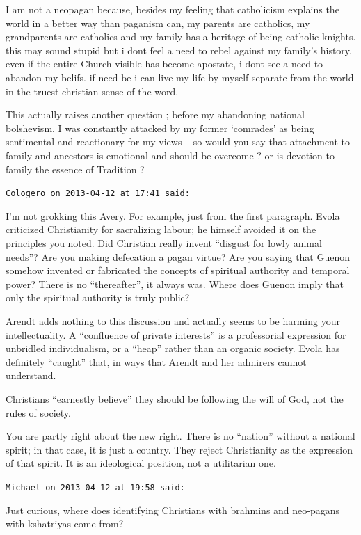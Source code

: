 \begin{footnotesize}
\begin{sffamily}
I am not a neopagan because, besides my feeling that catholicism explains the world in a better way than paganism can, my parents are catholics, my grandparents are catholics and my family has a heritage of being catholic knights. this may sound stupid but i dont feel a need to rebel against my family's history, even if the entire Church visible has become apostate, i dont see a need to abandon my belifs. if need be i can live my life by myself separate from the world in the truest christian sense of the word.

This actually raises another question ; before my abandoning national bolshevism, I was constantly attacked by my former `comrades' as being sentimental and reactionary for my views -- so would you say that attachment to family and ancestors is emotional and should be overcome ? or is devotion to family the essence of Tradition ?

\hfill

\texttt{Cologero on 2013-04-12 at 17:41 said:}

I'm not grokking this Avery. For example, just from the first paragraph. Evola criticized Christianity for sacralizing labour; he himself avoided it on the principles you noted. Did Christian really invent ``disgust for lowly animal needs''? Are you making defecation a pagan virtue? Are you saying that Guenon somehow invented or fabricated the concepts of spiritual authority and temporal power? There is no ``thereafter'', it always was. Where does Guenon imply that only the spiritual authority is truly public?

Arendt adds nothing to this discussion and actually seems to be harming your intellectuality. A ``confluence of private interests'' is a professorial expression for unbridled individualism, or a ``heap'' rather than an organic society. Evola has definitely ``caught'' that, in ways that Arendt and her admirers cannot understand.

Christians ``earnestly believe'' they should be following the will of God, not the rules of society.

You are partly right about the new right. There is no ``nation'' without a national spirit; in that case, it is just a country. They reject Christianity as the expression of that spirit. It is an ideological position, not a utilitarian one.

\hfill

\texttt{Michael on 2013-04-12 at 19:58 said:}

Just curious, where does identifying Christians with brahmins and neo-pagans with kshatriyas come from?


\end{sffamily}
\end{footnotesize}
